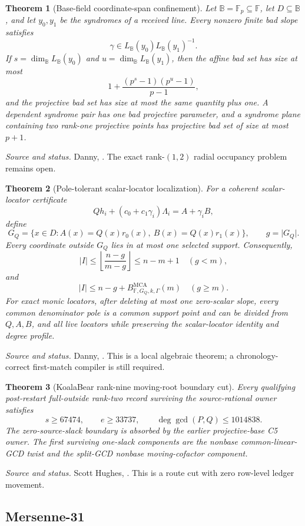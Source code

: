 \documentclass[11pt,a4paper]{amsart}
\numberwithin{equation}{section}
\newtheorem{theorem}{Theorem}[section]
\theoremstyle{remark}
\DeclareMathOperator{\MCA}{MCA}
\newcommand{\F}{\mathbb F}
\newcommand{\B}{\mathbb B}
\newcommand{\abs}[1]{\lvert#1\rvert}
\newcommand{\floor}[1]{\left\lfloor#1\right\rfloor}
\newcommand{\source}[1]{\par\smallskip\noindent\textit{Source and status.} #1\par}
\begin{document}
\begin{theorem}[Base-field coordinate-span confinement]\label{thm:coordinate-span}
Let $\B=\F_p\subseteq\F$, let $D\subseteq\B$, and let $y_0,y_1$ be the syndromes of a received line.  Every nonzero finite bad slope satisfies
\[
 \gamma\in L_{\B}(y_0)L_{\B}(y_1)^{-1}.
\]
If $s=\dim_{\B}L_{\B}(y_0)$ and $u=\dim_{\B}L_{\B}(y_1)$, then the affine bad set has size at most
\[
 1+\frac{(p^s-1)(p^u-1)}{p-1},
\]
and the projective bad set has size at most the same quantity plus one.  A dependent syndrome pair has one bad projective parameter, and a syndrome plane containing two rank-one projective points has projective bad set of size at most $p+1$.
\end{theorem}
\source{Danny, \cite{DannyCoordinateSpan26}.  The exact rank-$(1,2)$ radial occupancy problem remains open.}

\begin{theorem}[Pole-tolerant scalar-locator localization]\label{thm:pole}
For a coherent scalar-locator certificate
\[
 Qh_i+(c_0+c_1\gamma_i)\Lambda_i=A+\gamma_iB,
\]
define
\[
 G_Q=\{x\in D:A(x)=Q(x)r_0(x),\ B(x)=Q(x)r_1(x)\},
 \qquad g=\abs{G_Q}.
\]
Every coordinate outside $G_Q$ lies in at most one selected support.  Consequently,
\[
 \abs I\le\floor{\frac{n-g}{m-g}}\le n-m+1
 \quad(g<m),
\]
and
\[
 \abs I\le n-g+B^{\MCA}_{\F,G_Q,k,\Gamma}(m)
 \quad(g\ge m).
\]
For exact monic locators, after deleting at most one zero-scalar slope, every common denominator pole is a common support point and can be divided from $Q,A,B$, and all live locators while preserving the scalar-locator identity and degree profile.
\end{theorem}
\source{Danny, \cite{DannyPole26}.  This is a local algebraic theorem; a chronology-correct first-match compiler is still required.}

\begin{theorem}[KoalaBear rank-nine moving-root boundary cut]\label{thm:kb-rank9}
Every qualifying post-restart full-outside rank-two record surviving the source-rational owner satisfies
\[
 s\ge67474,
 \qquad e\ge33737,
 \qquad \deg\gcd(P,Q)\le1014838.
\]
The zero-source-slack boundary is absorbed by the earlier projective-base C5 owner.  The first surviving one-slack components are the nonbase common-linear-GCD twist and the split-GCD nonbase moving-cofactor component.
\end{theorem}
\source{Scott Hughes, \cite{HughesKBM126}.  This is a route cut with zero row-level ledger movement.}

\subsection*{Mersenne-31}
\end{document}
